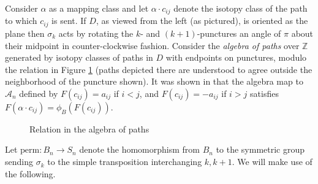 \documentclass[11pt]{amsart}
\def\Z{{\mathbb Z}}
\def\cl{\mathcal}
\def\s{{\sigma}}
\theoremstyle{definition}
\begin{document}
  Consider $\alpha$ as a mapping class and let $\alpha\cdot c_{ij}$ denote the isotopy class of the path to which $c_{ij}$ is sent. If $D$, as viewed from the left (as pictured), is oriented as the plane then $\s_k$ acts by rotating the $k\textrm{-}$ and $(k+1)\textrm{-}$punctures an angle of $\pi$ about their midpoint in counter-clockwise fashion. Consider the \emph{algebra of paths} over $\Z$ generated by isotopy classes of paths in $D$ with endpoints on punctures, modulo the relation in Figure \ref{FigRelnPathAlg} (paths depicted there are understood to agree outside the neighborhood of the puncture shown). It was shown in \cite{Ng05} that the algebra map to $\cl A_n$ defined by $F(c_{ij})=a_{ij}$ if $i<j$, and $F(c_{ij})=-a_{ij}$ if $i>j$ satisfies $F(\alpha\cdot c_{ij}) = \phi_B(F(c_{ij}))$.

  \begin{figure}[ht]
\caption{Relation in the algebra of paths}
\label{FigRelnPathAlg}
\end{figure}
  
  Let $\text{perm}:B_n\to S_n$ denote the homomorphism from $B_n$ to the symmetric group sending $\s_k$ to the simple transposition interchanging $k, k+1$. We will make use of the following.
\end{document}
